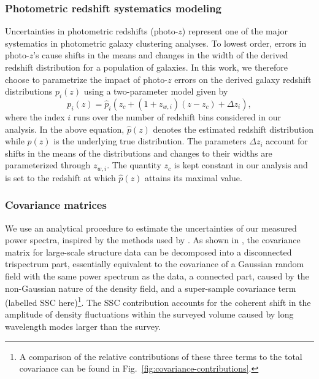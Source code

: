 \documentclass[a4paper,11pt]{article}
\begin{document}
  \subsubsection{Photometric redshift systematics modeling}\label{sssec:methods.theory.photoz_syst}
    Uncertainties in photometric redshifts (photo-$z$) represent one of the major systematics in photometric galaxy clustering analyses. To lowest order, errors in photo-$z$'s cause shifts in the means and changes in the width of the derived redshift distribution for a population of galaxies. In this work, we therefore choose to parametrize the impact of photo-$z$ errors on the derived galaxy redshift distributions $p_{i}(z)$ using a two-parameter model given by
    \begin{equation}
      p_{i}(z) = \hat{p}_{i}(z_{c} + (1 + z_{w, i})(z-z_{c}) + \Delta z_{i}),
      \label{eq:photo-z-model}
    \end{equation} 
    where the index $i$ runs over the number of redshift bins considered in our analysis. In the above equation, $\hat{p}(z)$ denotes the estimated redshift distribution while $p(z)$ is the underlying true distribution. The parameters $\Delta z_{i}$ account for shifts in the means of the distributions and changes to their widths are parameterized through $z_{w, i}$. The quantity $z_{c}$ is kept constant in our analysis and is set to the redshift at which $\hat{p}(z)$ attains its maximal value.
    
  \subsubsection{Covariance matrices}\label{sssec:methods.theory.covar}
    We use an analytical procedure to estimate the uncertainties of our measured power spectra, inspired by the methods used by \cite{Krause:2017}. As shown in \cite{2009MNRAS.395.2065T,Takada:2013}, the covariance matrix for large-scale structure data can be decomposed into a disconnected trispectrum part, essentially equivalent to the covariance of a Gaussian random field with the same power spectrum as the data, a connected part, caused by the non-Gaussian nature of the density field, and a super-sample covariance term (labelled SSC here)\footnote{A comparison of the relative contributions of these three terms to the total covariance can be found in Fig.~\ref{fig:covariance-contributions}.}. The SSC contribution accounts for the coherent shift in the amplitude of density fluctuations within the surveyed volume caused by long wavelength modes larger than the survey.
    
\end{document}
